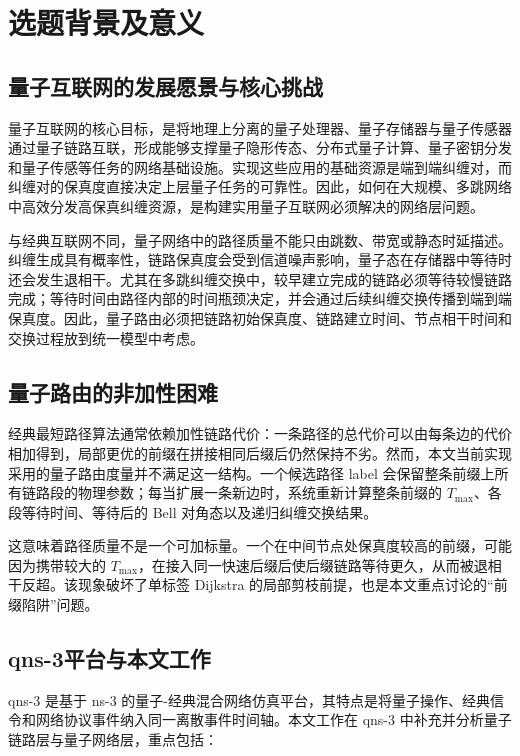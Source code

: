 
\chapter{选题背景及意义}

\section{量子互联网的发展愿景与核心挑战}

量子互联网的核心目标，是将地理上分离的量子处理器、量子存储器与量子传感器通过量子链路互联，形成能够支撑量子隐形传态、分布式量子计算、量子密钥分发和量子传感等任务的网络基础设施。实现这些应用的基础资源是端到端纠缠对，而纠缠对的保真度直接决定上层量子任务的可靠性。因此，如何在大规模、多跳网络中高效分发高保真纠缠资源，是构建实用量子互联网必须解决的网络层问题。

与经典互联网不同，量子网络中的路径质量不能只由跳数、带宽或静态时延描述。纠缠生成具有概率性，链路保真度会受到信道噪声影响，量子态在存储器中等待时还会发生退相干。尤其在多跳纠缠交换中，较早建立完成的链路必须等待较慢链路完成；等待时间由路径内部的时间瓶颈决定，并会通过后续纠缠交换传播到端到端保真度。因此，量子路由必须把链路初始保真度、链路建立时间、节点相干时间和交换过程放到统一模型中考虑。

\section{量子路由的非加性困难}

经典最短路径算法通常依赖加性链路代价：一条路径的总代价可以由每条边的代价相加得到，局部更优的前缀在拼接相同后缀后仍然保持不劣。然而，本文当前实现采用的量子路由度量并不满足这一结构。一个候选路径 label 会保留整条前缀上所有链路段的物理参数；每当扩展一条新边时，系统重新计算整条前缀的 $T_{\max}$、各段等待时间、等待后的 Bell 对角态以及递归纠缠交换结果。

这意味着路径质量不是一个可加标量。一个在中间节点处保真度较高的前缀，可能因为携带较大的 $T_{\max}$，在接入同一快速后缀后使后缀链路等待更久，从而被退相干反超。该现象破坏了单标签 Dijkstra 的局部剪枝前提，也是本文重点讨论的“前缀陷阱”问题。

\section{qns-3平台与本文工作}

qns-3 是基于 ns-3 的量子-经典混合网络仿真平台，其特点是将量子操作、经典信令和网络协议事件纳入同一离散事件时间轴。本文工作在 qns-3 中补充并分析量子链路层与量子网络层，重点包括：

